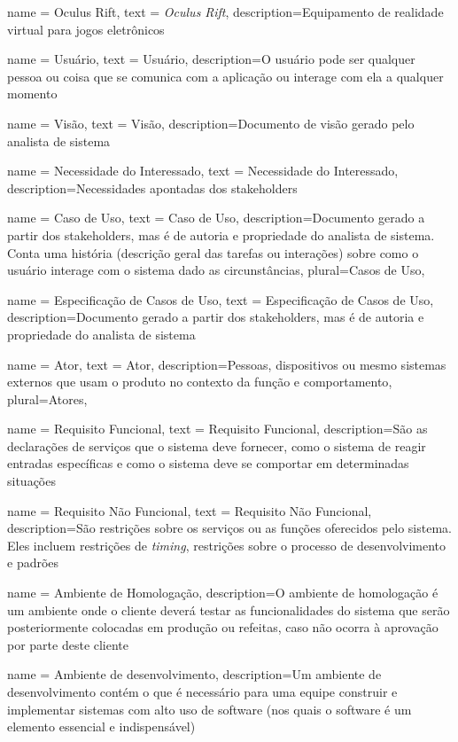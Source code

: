 {
	name = Oculus Rift,
	text = \textit{Oculus Rift},
	description={Equipamento de realidade virtual para jogos eletrônicos}
}


{
	name = Usu\'ario,
	text = Usu\'ario,
	description={O usuário pode ser qualquer pessoa ou coisa que se comunica com a aplicação ou interage com ela a qualquer momento}
}


{
	name = Vis\~ao,
	text = Vis\~ao,
	description={Documento de visão gerado pelo analista de sistema}
}


{
	name = Necessidade do Interessado,
	text = Necessidade do Interessado,
	description={Necessidades apontadas dos stakeholders}
}

{
	name = Caso de Uso,
	text = Caso de Uso,
	description={Documento gerado a partir dos stakeholders, mas é de autoria e propriedade do analista de sistema. Conta uma história (descrição geral das tarefas ou interações) sobre como o usuário interage com o sistema dado as circunstâncias},
	plural=Casos de Uso,
}



{
	name = Especifica\c c\~ao de Casos de Uso,
	text = Especifica\c c\~ao de Casos de Uso,
	description={Documento gerado a partir dos stakeholders, mas é de autoria e propriedade do analista de sistema}
}

{
	name = Ator,
	text = Ator,
	description={Pessoas, dispositivos ou mesmo sistemas externos que usam o produto no contexto da função e comportamento},
	plural=Atores,
}


{
	name = Requisito Funcional,
	text = Requisito Funcional,
	description={São as declarações de serviços que o sistema deve fornecer, como o sistema de reagir entradas específicas e como o sistema deve se comportar em determinadas situações}
}

{
	name = Requisito N\~ao Funcional,
	text = Requisito N\~ao Funcional,
	description={São restrições sobre os serviços ou as funções oferecidos pelo sistema. Eles incluem restrições de \textit{timing}, restrições sobre o processo de desenvolvimento e padrões}
}

{
	name = Ambiente de Homologa\c c\~ao,
	description={O ambiente de homologação é um ambiente onde o
cliente deverá testar as funcionalidades do sistema que serão posteriormente colocadas
em produção ou refeitas, caso não ocorra à aprovação por parte deste cliente}
}

{
	name = Ambiente de desenvolvimento,
	description={Um ambiente de desenvolvimento contém o que é
necessário para uma equipe construir e implementar sistemas com alto uso de software
(nos quais o software é um elemento essencial e indispensável)}
}